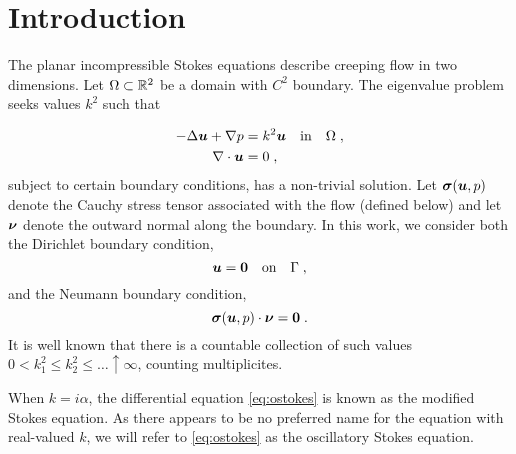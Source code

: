 \section{Introduction}

The planar incompressible Stokes equations describe
creeping flow in two dimensions. Let $\Omega \subset \mathbb{R}^2$
be a domain with $C^2$ boundary. The eigenvalue problem seeks
values $k^2$ such that 

\begin{align}
  -\Delta {\boldsymbol u} + \nabla p &= k^2 {\boldsymbol u} \quad \textrm{in} \quad
  \Omega \label{eq:ostokes} \; , \\
  \nabla \cdot {\boldsymbol u} &= 0 \; , \label{eq:ostokescty}
\end{align}
subject to certain boundary conditions, has a non-trivial solution.
Let ${\boldsymbol \sigma}({\boldsymbol u},p)$ denote the Cauchy stress tensor
associated with the flow (defined below) and let ${\boldsymbol \nu}$ denote
the outward normal along the boundary.
In this work, we consider both the Dirichlet boundary condition,
\begin{equation}
  {\boldsymbol u} = {\boldsymbol 0} \quad \textrm{on} \quad \Gamma \label{eq:ostokes_dir} \; ,
\end{equation}
and the Neumann boundary condition,
\begin{equation}
  {\boldsymbol \sigma}( {\boldsymbol u}, p ) \cdot {\boldsymbol \nu}  = {\boldsymbol 0} \; . \label{eq:ostokes_neu}
\end{equation}
It is well known that there is a countable collection of such
values $0 < k_{1}^{2} \leq k_{2}^2 \leq \ldots \uparrow \infty$,
counting multiplicites.

\begin{remark}
  When $k = i\alpha$, the differential equation
  \cref{eq:ostokes} is known as the modified Stokes
  equation. As there appears to be no preferred
  name for the equation with real-valued $k$,
  we will refer to \cref{eq:ostokes} as the
  oscillatory Stokes equation.
\end{remark}

